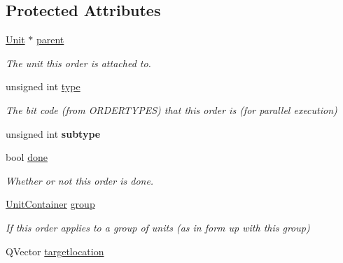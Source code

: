 \subsection*{Protected Attributes}
\begin{DoxyCompactItemize}
\item 
\hyperlink{classUnit}{Unit} $\ast$ \hyperlink{classOrder_a57548b2476945f89ac22fafa4cb5863b}{parent}\hypertarget{classOrder_a57548b2476945f89ac22fafa4cb5863b}{}\label{classOrder_a57548b2476945f89ac22fafa4cb5863b}

\begin{DoxyCompactList}\small\item\em The unit this order is attached to. \end{DoxyCompactList}\item 
unsigned int \hyperlink{classOrder_a66fec15be8c023a4b1b0a976eeeee266}{type}\hypertarget{classOrder_a66fec15be8c023a4b1b0a976eeeee266}{}\label{classOrder_a66fec15be8c023a4b1b0a976eeeee266}

\begin{DoxyCompactList}\small\item\em The bit code (from O\+R\+D\+E\+R\+T\+Y\+P\+ES) that this order is (for parallel execution) \end{DoxyCompactList}\item 
unsigned int {\bfseries subtype}\hypertarget{classOrder_ae3dfacf5550249e7218ce5f37b9433ef}{}\label{classOrder_ae3dfacf5550249e7218ce5f37b9433ef}

\item 
bool \hyperlink{classOrder_ab14f52031cd06d9877534bf102fe8d81}{done}\hypertarget{classOrder_ab14f52031cd06d9877534bf102fe8d81}{}\label{classOrder_ab14f52031cd06d9877534bf102fe8d81}

\begin{DoxyCompactList}\small\item\em Whether or not this order is done. \end{DoxyCompactList}\item 
\hyperlink{classUnitContainer}{Unit\+Container} \hyperlink{classOrder_a2069d9fa5fdda8416f69e2c28a65d6ea}{group}\hypertarget{classOrder_a2069d9fa5fdda8416f69e2c28a65d6ea}{}\label{classOrder_a2069d9fa5fdda8416f69e2c28a65d6ea}

\begin{DoxyCompactList}\small\item\em If this order applies to a group of units (as in form up with this group) \end{DoxyCompactList}\item 
Q\+Vector \hyperlink{classOrder_ab5b522145d83e77da31d164f3d82057d}{targetlocation}\hypertarget{classOrder_ab5b522145d83e77da31d164f3d82057d}{}\label{classOrder_ab5b522145d83e77da31d164f3d82057d}


\end{DoxyCompactItemize}
